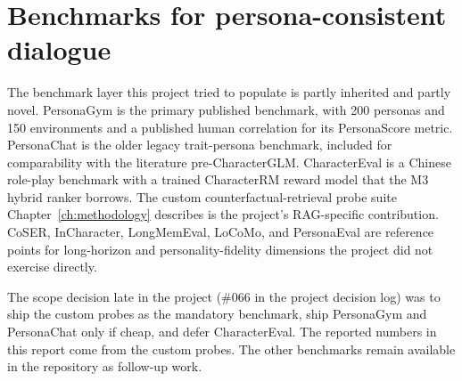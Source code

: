 \section{Benchmarks for persona-consistent dialogue}

The benchmark layer this project tried to populate is partly inherited and partly novel. PersonaGym is the primary published benchmark, with 200 personas and 150 environments and a published human correlation for its PersonaScore metric\autocite{personagym2024}. PersonaChat is the older legacy trait-persona benchmark, included for comparability with the literature pre-CharacterGLM\autocite{personachat2018}. CharacterEval is a Chinese role-play benchmark with a trained CharacterRM reward model that the M3 hybrid ranker borrows\autocite{charactereval2024}. The custom counterfactual-retrieval probe suite Chapter~\ref{ch:methodology} describes is the project's RAG-specific contribution. CoSER, InCharacter, LongMemEval, LoCoMo, and PersonaEval are reference points for long-horizon and personality-fidelity dimensions the project did not exercise directly\autocite{coser2025, incharacter2024, longmemeval2024, locomo2024, personaeval2024, valbench2024}.

The scope decision late in the project (\#066 in the project decision log) was to ship the custom probes as the mandatory benchmark, ship PersonaGym and PersonaChat only if cheap, and defer CharacterEval. The reported numbers in this report come from the custom probes. The other benchmarks remain available in the repository as follow-up work.
